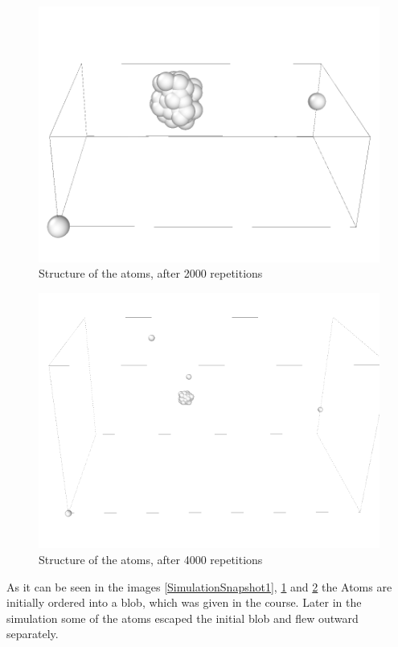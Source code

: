 \begin{figure}
	\begin{center}
		\includegraphics[scale= 0.75]{Figure/2ImageS.png}
	\end{center}
	\caption[Simulation Snapshot 2]{Structure of the atoms, after 2000 repetitions}
	\label{SimulationSnapshot2}
\end{figure}

\begin{figure}
	\begin{center}
		\includegraphics[scale= 0.65]{Figure/3ImageS.png}
	\end{center}
	\caption[Simulation Snapshot 3]{Structure of the atoms, after 4000 repetitions}
	\label{SimulationSnapshot3}
\end{figure}
As it can be seen in the images \ref{SimulationSnapshot1}, \ref{SimulationSnapshot2} and \ref{SimulationSnapshot3} the Atoms are initially ordered into a blob, which was given in the course. 
Later in the simulation some of the atoms escaped the initial blob and flew outward separately. 
